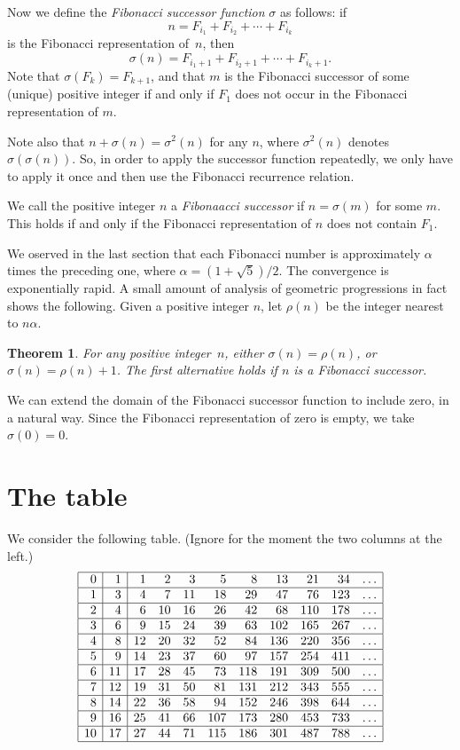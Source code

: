 \documentclass[12pt]{article}
\newtheorem{theorem}{Theorem}[section]
\begin{document}
Now we define the \emph{Fibonacci successor function} $\sigma$
as follows: if
\[n=F_{i_1}+F_{i_2}+\cdots+F_{i_k}\]
is the Fibonacci representation of~$n$, then
\[\sigma(n)=F_{i_1+1}+F_{i_2+1}+\cdots+F_{i_k+1}.\]
Note that $\sigma(F_k)=F_{k+1}$, and that $m$ is the Fibonacci
successor of some (unique) positive integer if and only if $F_1$
does not occur in the Fibonacci representation of $m$.

Note also that $n+\sigma(n)=\sigma^2(n)$ for any $n$, where
$\sigma^2(n)$ denotes $\sigma(\sigma(n))$. So, in order to
apply the successor function repeatedly, we only have to apply
it once and then use the Fibonacci recurrence relation.

We call the positive integer $n$ a \emph{Fibonaacci successor} if
$n=\sigma(m)$ for some $m$. This holds if and only if the
Fibonacci representation of $n$ does not contain $F_1$.

We oserved in the last section that each Fibonacci number is
approximately $\alpha$ times the preceding one, where $\alpha=
(1+\sqrt{5})/2$. The convergence is exponentially rapid. A small
amount of analysis of geometric progressions in fact shows the
following. Given a positive integer $n$, let $\rho(n)$ be the
integer nearest to $n\alpha$.

\begin{theorem}
For any positive integer~$n$, either $\sigma(n)=\rho(n)$, or
$\sigma(n)=\rho(n)+1$. The first alternative holds if $n$ is a
Fibonacci successor.
\label{t:approx}
\end{theorem}

We can extend the domain of the Fibonacci successor function to
include zero, in a natural way. Since the Fibonacci representation
of zero is empty, we take $\sigma(0)=0$.

\section{The table}
\label{s:table}

We consider the following table. (Ignore for the moment the
two columns at the left.)
\[
\begin{array}{|r|r|rrrrrrrrr|}
\hline
0&1&1&2&3&5&8&13&21&34&\ldots\\
\hline
1&3&4&7&11&18&29&47&76&123&\ldots\\
\hline
2&4&6&10&16&26&42&68&110&178&\ldots\\
\hline
3&6&9&15&24&39&63&102&165&267&\ldots\\
\hline
4&8&12&20&32&52&84&136&220&356&\ldots\\
\hline
5&9&14&23&37&60&97&157&254&411&\ldots\\
\hline
6&11&17&28&45&73&118&191&309&500&\ldots\\
\hline
7&12&19&31&50&81&131&212&343&555&\ldots\\
\hline
8&14&22&36&58&94&152&246&398&644&\ldots\\
\hline
9&16&25&41&66&107&173&280&453&733&\ldots\\
\hline
10&17&27&44&71&115&186&301&487&788&\ldots\\
\hline
\end{array}
\]
\end{document}
